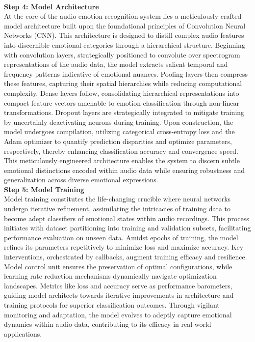 \\
\textbf{Step 4: Model Architecture}
\\
At the core of the audio emotion recognition system lies a meticulously crafted model architecture built upon the foundational principles of Convolution Neural Networks (CNN). This architecture is designed to distill complex audio features into discernible emotional categories through a hierarchical structure. Beginning with convolution layers, strategically positioned to convolute over spectrogram representations of the audio data, the model extracts salient temporal and frequency patterns indicative of emotional nuances. Pooling layers then compress these features, capturing their spatial hierarchies while reducing computational complexity. Dense layers follow, consolidating hierarchical representations into compact feature vectors amenable to emotion classification through non-linear transformations. Dropout layers are strategically integrated to mitigate training by uncertainly deactivating neurons during training. Upon construction, the model undergoes compilation, utilizing categorical cross-entropy loss and the Adam optimizer to quantify prediction disparities and optimize parameters, respectively, thereby enhancing classification accuracy and convergence speed. This meticulously engineered architecture enables the system to discern subtle emotional distinctions encoded within audio data while ensuring robustness and generalization across diverse emotional expressions.
\\
\textbf{Step 5: Model Training}
\\
Model training constitutes the life-changing crucible where neural networks undergo iterative refinement, assimilating the intricacies of training data to become adept classifiers of emotional states within audio recordings. This process initiates with dataset partitioning into training and validation subsets, facilitating performance evaluation on unseen data. Amidst epochs of training, the model refines its parameters repetitively to minimize loss and maximize accuracy. Key interventions, orchestrated by callbacks, augment training efficacy and resilience. Model control unit ensures the preservation of optimal configurations, while learning rate reduction mechanisms dynamically navigate optimization landscapes. Metrics like loss and accuracy serve as performance barometers, guiding model architects towards iterative improvements in architecture and training protocols for superior classification outcomes. Through vigilant monitoring and adaptation, the model evolves to adeptly capture emotional dynamics within audio data, contributing to its efficacy in real-world applications.
